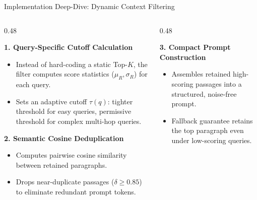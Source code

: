 \documentclass[10pt,aspectratio=169]{beamer}
\begin{document}
\begin{frame}{Implementation Deep-Dive: Dynamic Context Filtering}
    \begin{columns}[onlytextwidth,T]
        \begin{column}{0.48\textwidth}
            \begin{block}{\textbf{1. Query-Specific Cutoff Calculation}}
                \begin{itemize}
                    \item Instead of hard-coding a static Top-$K$, the filter computes score statistics ($\mu_R, \sigma_R$) for each query.
                    \item Sets an adaptive cutoff $\tau(q)$: tighter threshold for easy queries, permissive threshold for complex multi-hop queries.
                \end{itemize}
            \end{block}
            
            \begin{block}{\textbf{2. Semantic Cosine Deduplication}}
                \begin{itemize}
                    \item Computes pairwise cosine similarity between retained paragraphs.
                    \item Drops near-duplicate passages ($\delta \ge 0.85$) to eliminate redundant prompt tokens.
                \end{itemize}
            \end{block}
        \end{column}
        
        \begin{column}{0.48\textwidth}
            \begin{block}{\textbf{3. Compact Prompt Construction}}
                \begin{itemize}
                    \item Assembles retained high-scoring passages into a structured, noise-free prompt.
                    \item Fallback guarantee retains the top paragraph even under low-scoring queries.
                \end{itemize}
            \end{block}
            

\end{column}
\end{columns}
\end{frame}
\end{document}
